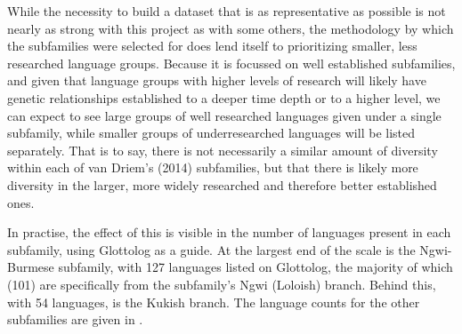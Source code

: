 While the necessity to build a dataset that is as representative as possible is not nearly as strong with this project as with some others, the methodology by which the subfamilies were selected for  does lend itself to prioritizing smaller, less researched language groups. Because it is focussed on well established subfamilies, and given that language groups with higher levels of research will likely have genetic relationships established to a deeper time depth or to a higher level, we can expect to see large groups of well researched languages given under a single subfamily, while smaller groups of underresearched languages will be listed separately. That is to say, there is not necessarily a similar amount of diversity within each of van Driem's (2014) subfamilies, but that there is likely more diversity in the larger, more widely researched and therefore better established ones.

In practise, the effect of this is visible in the number of languages present in each subfamily, using Glottolog \cite{glottolog} as a guide. At the largest end of the scale is the Ngwi-Burmese subfamily, with 127 languages listed on Glottolog, the majority of which (101) are specifically from the subfamily's Ngwi (Loloish) branch. Behind this, with 54 languages, is the Kukish branch. The language counts for the other subfamilies are given in .

